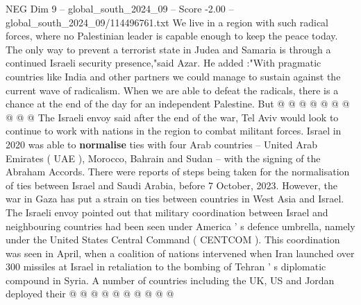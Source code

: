 \begin{textsample}{NEG Dim 9 – global\_south\_2024\_09 – Score -2.00 – global\_south\_2024\_09/114496761.txt}
We live in a region with such radical forces, where no Palestinian leader is capable enough to keep the peace today.
The only way to prevent a terrorist state in Judea and Samaria is through a continued Israeli security presence,"said Azar.
He added :"With pragmatic countries like India and other partners we could manage to sustain against the current wave of radicalism.
When we are able to defeat the radicals, there is a chance at the end of the day for an independent Palestine.
But @ @ @ @ @ @ @ @ @ @ The Israeli envoy said after the end of the war, Tel Aviv would look to continue to work with nations in the region to combat militant forces.
Israel in 2020 was able to \textbf{normalise} ties with four Arab countries -- United Arab Emirates ( UAE ), Morocco, Bahrain and Sudan -- with the signing of the Abraham Accords.
There were reports of steps being taken for the normalisation of ties between Israel and Saudi Arabia, before 7 October, 2023.
However, the war in Gaza has put a strain on ties between countries in West Asia and Israel.
The Israeli envoy pointed out that military coordination between Israel and neighbouring countries had been seen under America ' s defence umbrella, namely under the United States Central Command ( CENTCOM ).
This coordination was seen in April, when a coalition of nations intervened when Iran launched over 300 missiles at Israel in retaliation to the bombing of Tehran ' s diplomatic compound in Syria.
A number of countries including the UK, US and Jordan deployed their @ @ @ @ @ @ @ @ @ @

\end{textsample}
